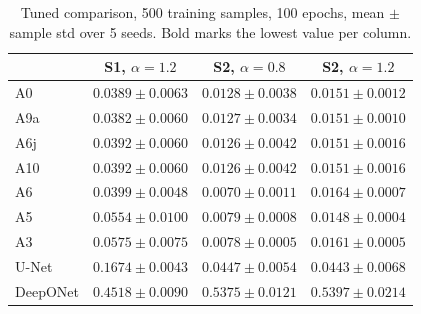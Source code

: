 \documentclass[conference]{IEEEtran}
\begin{document}
\begin{table}[t]
\caption{Tuned comparison, 500 training samples, 100 epochs, mean $\pm$ sample std over 5 seeds. Bold marks the lowest value per column.}
\label{tab:tuned}
\centering
\scriptsize
\setlength{\tabcolsep}{2.2pt}
\begin{tabular}{@{}lccc@{}}
\toprule
 & S1, $\alpha{=}1.2$ & S2, $\alpha{=}0.8$ & S2, $\alpha{=}1.2$ \\
\midrule
A0 & $0.0389\pm0.0063$ & $0.0128\pm0.0038$ & $0.0151\pm0.0012$ \\
A9a & $\mathbf{0.0382\pm0.0060}$ & $0.0127\pm0.0034$ & $0.0151\pm0.0010$ \\
A6j & $0.0392\pm0.0060$ & $0.0126\pm0.0042$ & $0.0151\pm0.0016$ \\
A10 & $0.0392\pm0.0060$ & $0.0126\pm0.0042$ & $0.0151\pm0.0016$ \\
A6 & $0.0399\pm0.0048$ & $\mathbf{0.0070\pm0.0011}$ & $0.0164\pm0.0007$ \\
A5 & $0.0554\pm0.0100$ & $0.0079\pm0.0008$ & $\mathbf{0.0148\pm0.0004}$ \\
A3 & $0.0575\pm0.0075$ & $0.0078\pm0.0005$ & $0.0161\pm0.0005$ \\
U-Net & $0.1674\pm0.0043$ & $0.0447\pm0.0054$ & $0.0443\pm0.0068$ \\
DeepONet & $0.4518\pm0.0090$ & $0.5375\pm0.0121$ & $0.5397\pm0.0214$ \\
\bottomrule
\end{tabular}
\end{table}
\end{document}
